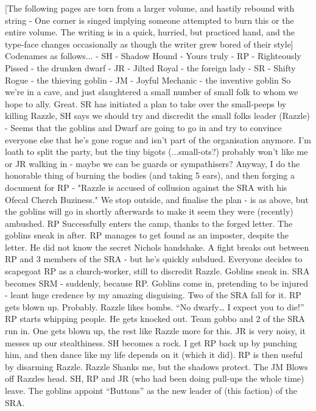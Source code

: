 \documentclass[letterpaper,10pt,twoside,twocolumn,openany]{book}
\begin{document}
[The following pages are torn from a larger volume, and hastily rebound with string - One corner is singed implying someone attempted to burn this or the entire volume.
The writing is in a quick, hurried, but practiced hand, and the type-face changes occasionally as though the writer grew bored of their style]
Codenames as follows...
- SH - Shadow Hound - Yours truly
- RP - Righteously Pissed - the drunken dwarf
- JR - Jilted Royal - the foreign lady
- SR - Shifty Rogue - the thieving goblin
- JM - Joyful Mechanic - the inventive goblin
So we’re in a cave, and just slaughtered a small number of small folk to whom we hope to ally. Great.
SR has initiated a plan to take over the small-peeps by killing Razzle, SH says we should try and discredit the small folks leader (Razzle) - Seems that the goblins and Dwarf are going to go in and try to convince everyone else that he’s gone rogue and isn’t part of the organisation anymore.
I’m loath to split the party, but the tiny bigots (...small-ots?) probably won’t like me or JR walking in - maybe we can be guards or sympathisers?
Anyway, I do the honorable thing of burning the bodies (and taking 5 ears), and then forging a document for RP -
"Razzle is accused of collusion against the SRA with his Ofecal Cherch Buziness."
We stop outside, and finalise the plan - is as above, but the goblins will go in shortly afterwards to make it seem they were (recently) ambushed.
RP Successfully enters the camp, thanks to the forged letter. The goblins sneak in after. RP manages to get found as an imposter, despite the letter. He did not know the secret Nichols handshake.
A fight breaks out between RP and 3 members of the SRA - but he’s quickly subdued.
Everyone decides to scapegoat RP as a church-worker, still to discredit Razzle. Goblins sneak in.
SRA becomes SRM - suddenly, because RP.
Goblins come in, pretending to be injured - leant huge credence by my amazing disguising. Two of the SRA fall for it.
RP gets blown up. Probably. Razzle likes bombs. “No dwarfy… I expect you to die!”
RP starts whipping people. He gets knocked out.
Team gobbo and 2 of the SRA run in. One gets blown up, the rest like Razzle more for this.
JR is very noisy, it messes up our stealthiness.
SH becomes a rock.
I get RP back up by punching him, and then dance like my life depends on it (which it did).
RP is then useful by disarming Razzle.
Razzle Shanks me, but the shadows protect.
The JM Blows off Razzles head.
SH, RP and JR (who had been doing pull-ups the whole time) leave.
The goblins appoint “Buttons” as the new leader of (this faction) of the SRA.
\end{document}
